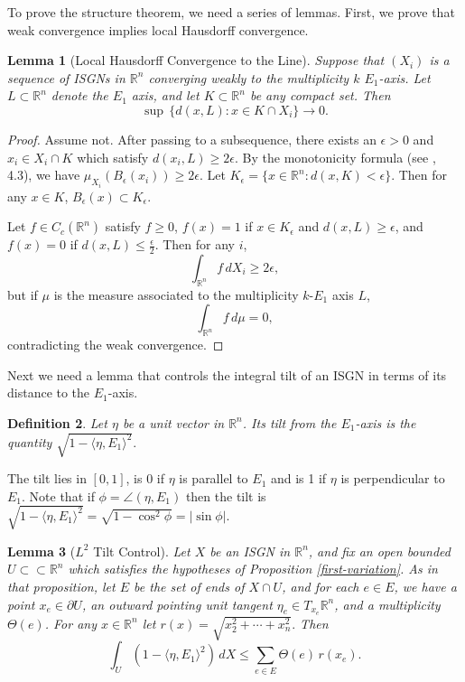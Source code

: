 \documentclass[10pt,a4paper]{amsart}
\newtheorem{lemma}{Lemma}
\newtheorem{definition}[lemma]{Definition}
\begin{document}
To prove the structure theorem, we need a series of lemmas. First, we prove that weak convergence implies local Hausdorff convergence.

\begin{lemma}[Local Hausdorff Convergence to the Line] \label{hausdorff-convergence}
    Suppose that $(X_i)$ is a sequence of ISGNs in $\mathbb{R}^n$ converging weakly to the multiplicity $k$ $E_1$-axis. Let $L \subset \mathbb{R}^n$ denote the $E_1$ axis, and let $K \subset \mathbb{R}^n$ be any compact set. Then
    \[\sup \, \{d(x,L): x \in K \cap X_i\} \to 0.\]
\end{lemma}

\begin{proof}
Assume not. After passing to a subsequence, there exists an $\epsilon > 0$ and $x_i \in X_i \cap K$ which satisfy $d(x_i,L) \geq 2\epsilon.$ By the monotonicity formula (see \cite{simon_gmt}, 4.3), we have $\mu_{X_i}(B_\epsilon(x_i)) \geq 2\epsilon$. Let $K_\epsilon = \{x \in \mathbb{R}^n: d(x,K) < \epsilon\}$. Then for any $x \in K$, $B_\epsilon(x) \subset K_\epsilon$.

Let $f \in C_c(\mathbb{R}^n)$ satisfy $f \geq 0$, $f(x) = 1$ if $x \in K_\epsilon$ and $d(x,L) \geq \epsilon$, and $f(x) = 0$ if $d(x,L) \leq \frac{\epsilon}{2}$. Then for any $i$,
\[\int_{\mathbb{R}^n} f \, dX_i \geq 2\epsilon,\]
but if $\mu$ is the measure associated to the multiplicity $k$-$E_1$ axis $L$,
\[\int_{\mathbb{R}^n} f \, d\mu = 0,\]
contradicting the weak convergence.
\end{proof}

Next we need a lemma that controls the integral tilt of an ISGN in terms of its distance to the $E_1$-axis.

\begin{definition}
    Let $\eta$ be a unit vector in $\mathbb{R}^n$. Its \emph{tilt} from the $E_1$-axis is the quantity $\sqrt{1 - \langle \eta,E_1\rangle^2}.$
\end{definition}

The tilt lies in $[0,1]$, is $0$ if $\eta$ is parallel to $E_1$ and is 1 if $\eta$ is perpendicular to $E_1$. Note that if $\phi = \angle(\eta, E_1)$ then the tilt is $\sqrt{1 - \langle\eta,E_1\rangle^2} = \sqrt{1 - \cos^2 \phi} = |\sin \phi|.$

\begin{lemma}[$L^2$ Tilt Control] \label{tilt-control}
Let $X$ be an ISGN in $\mathbb{R}^n$, and fix an open bounded $U \subset\subset \mathbb{R}^n$ which satisfies the hypotheses of Proposition \ref{first-variation}. As in that proposition, let $E$ be the set of ends of $X \cap U$, and for each $e \in E$, we have a point $x_e \in \partial U$, an outward pointing unit tangent $\eta_e \in T_{x_e}\mathbb{R}^n$, and a multiplicity $\Theta(e)$. For any $x \in \mathbb{R}^n$ let $r(x) = \sqrt{x_2^2 + \cdots + x_n^2}.$ Then
\[\int_U (1 - \langle \eta,E_1\rangle^2) \, dX \leq \sum_{e \in E} \Theta(e) \, r(x_e).\]
\end{lemma}
\end{document}
